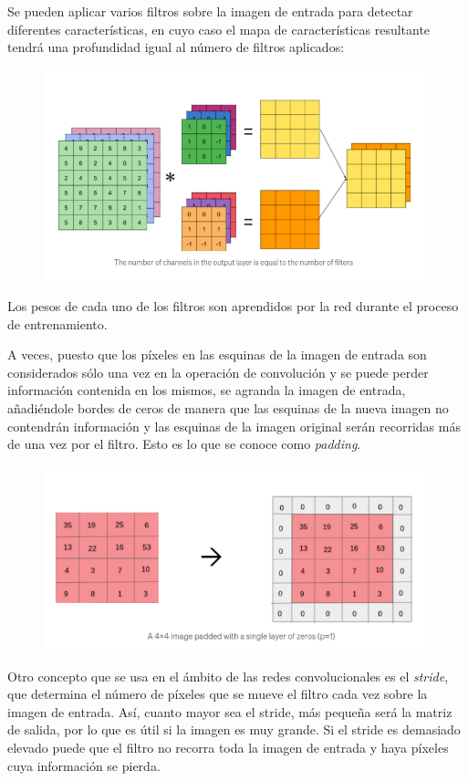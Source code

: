 \documentclass[a4paper,11pt]{article}
\begin{document}
Se pueden aplicar varios filtros sobre la imagen de entrada para detectar diferentes características, en cuyo caso el mapa de características resultante tendrá una profundidad igual al número de filtros aplicados:

\begin{figure}[H]
	\centering
	\includegraphics[width=1\linewidth]{img/conv3}
	\caption{}
	\label{fig:conv3}
\end{figure}

Los pesos de cada uno de los filtros son aprendidos por la red durante el proceso de entrenamiento. 


A veces, puesto que los píxeles en las esquinas de la imagen de entrada son considerados sólo una vez en la operación de convolución y se puede perder información contenida en los mismos, se agranda la imagen de entrada, añadiéndole bordes de ceros de manera que las esquinas de la nueva imagen no contendrán información y las esquinas de la imagen original serán recorridas más de una vez por el filtro. Esto es lo que se conoce como \textit{padding}.

\begin{figure}[H]
	\centering
	\includegraphics[width=0.8\linewidth]{img/conv4}
	\caption{}
	\label{fig:conv4}
\end{figure}

Otro concepto que se usa en el ámbito de las redes convolucionales es el \textit{stride}, que determina el número de píxeles que se mueve el filtro cada vez sobre la imagen de entrada. Así, cuanto mayor sea el stride, más pequeña será la matriz de salida, por lo que es útil si la imagen es muy grande. Si el stride es demasiado elevado puede que el filtro no recorra toda la imagen de entrada y haya píxeles cuya información se pierda. 
\end{document}
